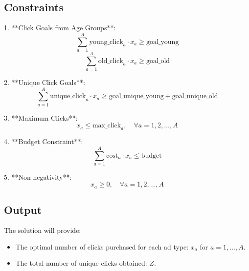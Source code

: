 \documentclass{article}
\begin{document}
\subsection*{Constraints}
1. **Click Goals from Age Groups**:
    \[
    \sum_{a=1}^{A} \text{young\_click}_{a} \cdot x_{a} \geq \text{goal\_young}
    \]
    \[
    \sum_{a=1}^{A} \text{old\_click}_{a} \cdot x_{a} \geq \text{goal\_old}
    \]

2. **Unique Click Goals**:
    \[
    \sum_{a=1}^{A} \text{unique\_click}_{a} \cdot x_{a} \geq \text{goal\_unique\_young} + \text{goal\_unique\_old}
    \]

3. **Maximum Clicks**:
    \[
    x_{a} \leq \text{max\_click}_{a}, \quad \forall a = 1, 2, \ldots, A
    \]

4. **Budget Constraint**:
    \[
    \sum_{a=1}^{A} \text{cost}_{a} \cdot x_{a} \leq \text{budget}
    \]

5. **Non-negativity**:
    \[
    x_{a} \geq 0, \quad \forall a = 1, 2, \ldots, A
    \]

\subsection*{Output}
The solution will provide:
\begin{itemize}
    \item The optimal number of clicks purchased for each ad type: \( x_{a} \) for \( a = 1, \ldots, A \).
    \item The total number of unique clicks obtained: \( Z \).
\end{itemize}
\end{document}
